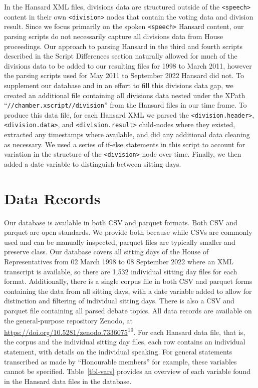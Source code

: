 \documentclass[
  letterpaper,
  DIV=11,
  numbers=noendperiod]{scrartcl}
\begin{document}
In the Hansard XML files, divisions data are structured outside of the
\texttt{\textless{}speech\textgreater{}} content in their own
\texttt{\textless{}division\textgreater{}} nodes that contain the voting
data and division result. Since we focus primarily on the spoken
\texttt{\textless{}speech\textgreater{}} Hansard content, our parsing
scripts do not necessarily capture all divisions data from House
proceedings. Our approach to parsing Hansard in the third and fourth
scripts described in the Script Differences section naturally allowed
for much of the divisions data to be added to our resulting files for
1998 to March 2011, however the parsing scripts used for May 2011 to
September 2022 Hansard did not. To supplement our database and in an
effort to fill this divisions data gap, we created an additional file
containing all divisions data nested under the XPath
``\texttt{//chamber.xscript//division}'' from the Hansard files in our
time frame. To produce this data file, for each Hansard XML we parsed
the \texttt{\textless{}division.header\textgreater{}},
\texttt{\textless{}division.data\textgreater{}}, and
\texttt{\textless{}division.result\textgreater{}} child-nodes where they
existed, extracted any timestamps where available, and did any
additional data cleaning as necessary. We used a series of if-else
statements in this script to account for variation in the structure of
the \texttt{\textless{}division\textgreater{}} node over time. Finally,
we then added a date variable to distinguish between sitting days.

\hypertarget{data-records}{%
\section{Data Records}\label{data-records}}

Our database is available in both CSV and parquet formats. Both CSV and
parquet are open standards. We provide both because while CSVs are
commonly used and can be manually inspected, parquet files are typically
smaller and preserve class. Our database covers all sitting days of the
House of Representatives from 02 March 1998 to 08 September 2022 where
an XML transcript is available, so there are 1,532 individual sitting
day files for each format. Additionally, there is a single corpus file
in both CSV and parquet forms containing the data from all sitting days,
with a date variable added to allow for distinction and filtering of
individual sitting days. There is also a CSV and parquet file containing
all parsed debate topics. All data records are available on the
general-purpose repository Zenodo, at
\url{https://doi.org/10.5281/zenodo.7336075}\textsuperscript{19}. For
each Hansard data file, that is, the corpus and the individual sitting
day files, each row contains an individual statement, with details on
the individual speaking. For general statements transcribed as made by
``Honourable members'' for example, these variables cannot be specified.
Table~\ref{tbl-vars} provides an overview of each variable found in the
Hansard data files in the database.
\end{document}
